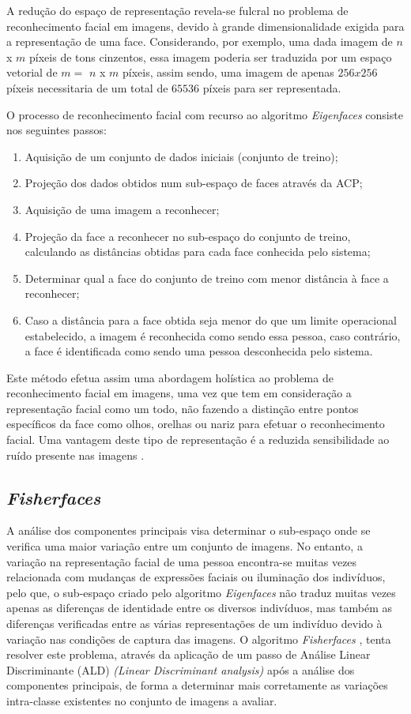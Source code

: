 A redução do espaço de representação revela-se fulcral no problema de reconhecimento facial em imagens, devido à grande dimensionalidade exigida para a representação de uma face. Considerando, por exemplo, uma dada imagem de $n$ x $m$ píxeis de tons cinzentos, essa imagem poderia ser traduzida por um espaço vetorial de $m = $ $n$ x $m$ píxeis, assim sendo, uma imagem de apenas $256x256$ píxeis necessitaria de um total de $65536$ píxeis para ser representada.

O processo de reconhecimento facial com recurso ao algoritmo \textit{Eigenfaces} consiste nos seguintes passos:
\begin{enumerate}
\item Aquisição de um conjunto de dados iniciais (conjunto de treino);
\item Projeção dos dados obtidos num sub-espaço de faces através da ACP;
\item Aquisição de uma imagem a reconhecer;
\item Projeção da face a reconhecer no sub-espaço do conjunto de treino, calculando as distâncias obtidas para cada face conhecida pelo sistema;
\item Determinar qual a face do conjunto de treino com menor distância à face a reconhecer;
\item Caso a distância para a face obtida seja menor do que um limite operacional estabelecido, a imagem é reconhecida como sendo essa pessoa, caso contrário, a face é identificada como sendo uma pessoa desconhecida pelo sistema.
\end{enumerate}

Este método efetua assim uma abordagem holística ao problema de reconhecimento facial em imagens, uma vez que tem em consideração a representação facial como um todo, não fazendo a distinção entre pontos específicos da face como olhos, orelhas ou nariz para efetuar o reconhecimento facial. Uma vantagem deste tipo de representação é a reduzida sensibilidade ao ruído presente nas imagens \cite{Zhao2003}.

\subsection{\textit{Fisherfaces}} \label{sec:fisher}
A análise dos componentes principais visa determinar o sub-espaço onde se verifica uma maior variação entre um conjunto de imagens. No entanto, a variação na representação facial de uma pessoa encontra-se muitas vezes relacionada com mudanças de expressões faciais ou iluminação dos indivíduos, pelo que, o sub-espaço criado pelo algoritmo \textit{Eigenfaces} não traduz muitas vezes apenas as diferenças de identidade entre os diversos indivíduos, mas também as diferenças verificadas entre as várias representações de um indivíduo devido à variação nas condições de captura das imagens. O algoritmo \textit{Fisherfaces} \cite{Belhumeur1997, Etemad1997, Zhao1998}, tenta resolver este problema, através da aplicação de um passo de Análise Linear Discriminante (ALD) \textit{(Linear Discriminant analysis)} após a análise dos componentes principais, de forma a determinar mais corretamente as variações intra-classe existentes no conjunto de imagens a avaliar.

